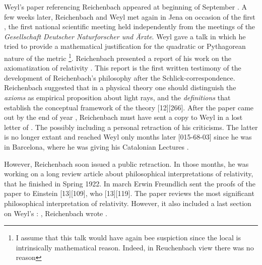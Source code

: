 \documentclass[draft]{article}
\begin{document}
Weyl's paper referencing Reichenbach appeared at beginning of September \citep{Weyl1921e}. A few weeks later, Reichenbach and Weyl met again in Jena on occasion of the first  , the first national scientific meeting held independently from the meetings of the \textit{Gesellschaft Deutscher Naturforscher und Ärzte}. Weyl gave a talk in which he tried to provide a mathematical justification for the quadratic or Pythagorean nature of the metric \citep{Weyl1921f}\footnote{I assume that this talk would have again bee suspiction since the local is intrinsically mathematical reason. Indeed, in Reuchenbach view there was no reason}. Reichenbach presented a report of his work on the axiomatization of relativity \citep{Reichenbach1921d}. This report is the first written testimony of the development of Reichenbach's philosophy after the Schlick-correspondence. Reichenbach suggested that in a physical theory one should distinguish the \emph{axioms} as empirical proposition about light rays, \rac\etc and the \emph{definitions} that establish the conceptual framework of the theory [12][266]. After the paper came out by the end of year \citep{Reichenbach1921d}, Reichenbach must have sent a copy to Weyl in a lost letter of . The possibly including a personal retraction of his criticisms. The latter is no longer extant and reached Weyl only months later [015-68-03] since he was in Barcelona, where he was giving his Catalonian Lectures \citep{Weyl1923}.

However, Reichenbach soon issued a public retraction. In those months, he was working on a long review article about philosophical interpretations of relativity, that he finished in Spring 1922. In march Erwin Freundlich sent the proofs of the paper  to Einstein [13][109], who  [13][119]. The paper reviews the most significant philosophical interpretation of relativity. However, it also included a last section on Weyl's \uft: , Reichenbach wrote  \citep[365]{Reichenbach1922a}.
\end{document}
